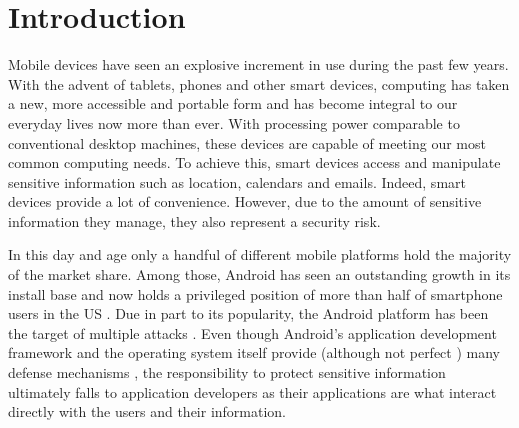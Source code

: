 \documentclass[conference]{IEEEtran}
\begin{document}





%
\IEEEpeerreviewmaketitle



\section{Introduction}
Mobile devices have seen an explosive increment in use during the past few years. With the advent of tablets, phones and other smart devices, computing has taken a new, more accessible and portable form and has become integral to our everyday lives now more than ever. With processing power comparable to conventional desktop machines, these devices are capable of meeting our most common computing needs. To achieve this, smart devices access and manipulate sensitive information such as location, calendars and emails. Indeed, smart devices provide a lot of convenience. However, due to the amount of sensitive information they manage, they also represent a security risk.

In this day and age only a handful of different mobile platforms hold the majority of the market share. Among those, Android has seen an outstanding growth in its install base and now holds a privileged position of more than half of smartphone users in the US \cite{_android_news}. Due in part to its popularity, the Android platform has been the target of multiple attacks \cite{vidas_all_2011}. Even though Android's application development framework and the operating system itself provide (although not perfect \cite{shabtai_google_2010}) many defense mechanisms \cite{burns2009mobile} \cite{enck2011study}, the responsibility to protect sensitive information ultimately falls to application developers as their applications are what interact directly with the users and their information.
\end{document}
